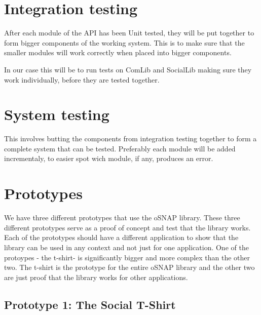 \section{Integration testing}
After each module of the API has been Unit tested, they will be put together to form bigger components 
of the working system. This is to make sure that the smaller modules will work correctly when placed 
into bigger components. 

In our case this will be to run tests on ComLib and SocialLib making sure they work individually, 
before they are tested together.

\section{System testing}
This involves butting the components from integration testing together to form a complete system that 
can be tested. Preferably each module will be added incrementaly, to easier spot wich module, if any, 
produces an error.

\section{Prototypes}
We have three different prototypes that use the oSNAP library. These three different prototypes serve
as a proof of concept and test that the library works. Each of the prototypes should have a different
application to show that the library can be used in any context and not just for one application. One of
the protoypes - the t-shirt- is significantly bigger and more complex than the other two. The t-shirt
is the prototype for the entire oSNAP library and the other two are just proof that the library works
for other applications.
\newpage
\subsection{Prototype 1: The Social T-Shirt}

